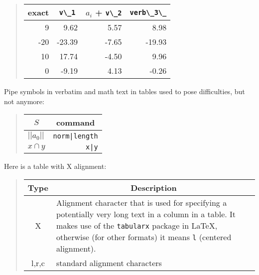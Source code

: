 \documentclass[%
oneside,                 %
final,                   %
10pt]{article}
\theoremstyle{definition}
\begin{document}
\begin{enumerate}
\begin{quote}
\begin{tabular}{rrrr}
\hline
\multicolumn{1}{c}{ exact } & \multicolumn{1}{c}{ \Verb!v\_1! } & \multicolumn{1}{c}{ $a_i$ + \Verb!v\_2! } & \multicolumn{1}{c}{ \Verb!verb\_3\_! } \\
\hline
9     & 9.62       & 5.57               & 8.98           \\
-20   & -23.39     & -7.65              & -19.93         \\
10    & 17.74      & -4.50              & 9.96           \\
0     & -9.19      & 4.13               & -0.26          \\
\hline
\end{tabular}
\end{quote}

\noindent
Pipe symbols in verbatim and math text in tables used to pose difficulties,
but not
anymore:


\begin{quote}
\begin{tabular}{lr}
\hline
\multicolumn{1}{c}{ $S$ } & \multicolumn{1}{c}{ command } \\
\hline
$ ||a_0|| $ & \texttt{norm|length} \\
$x\cap y$   & \texttt{x|y}         \\
\hline
\end{tabular}
\end{quote}

\noindent
Here is a table with X alignment:


\begin{quote}
\begin{tabularx}{\linewidth}{cX}
\hline
\multicolumn{1}{c}{ Type } & \multicolumn{1}{c}{ Description } \\
\hline
X     & Alignment character that is used for specifying a potentially very long text in a column in a table. It makes use of the \texttt{tabularx} package in {\LaTeX}, otherwise (for other formats) it means \texttt{l} (centered alignment). \\
l,r,c & standard alignment characters                                                                                                                                                                                                       \\
\hline
\end{tabularx}
\end{quote}


\end{enumerate}
\end{document}
